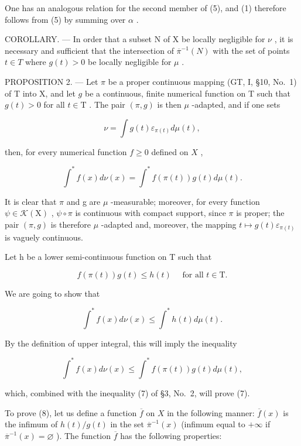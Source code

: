 One has an analogous relation for the second member of (5), and (1) therefore follows from (5) by summing over \(\alpha\) .

COROLLARY. --- In order that a subset N of X be locally negligible for \(\nu\) , it is necessary and sufficient that the intersection of \(\overline{\pi}^{-1}(N)\) with the set of points \(t \in T\) where \(g(t) > 0\) be locally negligible for \(\mu\) .

PROPOSITION 2. --- Let \(\pi\) be a proper continuous mapping (GT, I, §10, No.~1) of T into X, and let \(g\) be a continuous, finite numerical function on T such that \(g(t) > 0\) for all \(t \in \mathrm{T}\) . The pair \((\pi, g)\) is then \(\mu\) -adapted, and if one sets

\[
\nu = \int g (t) \varepsilon_ {\pi (t)} d \mu (t),
\]

then, for every numerical function \(f \geqslant 0\) defined on \(X\) ,

\[
\int^ {*} f (x) d \nu (x) = \int^ {*} f (\pi (t)) g (t) d \mu (t).\tag{7}
\]

It is clear that \(\pi\) and g are \(\mu\) -measurable; moreover, for every function \(\psi \in \mathcal{K}(\mathrm{X})\) , \(\psi \circ \pi\) is continuous with compact support, since \(\pi\) is proper; the pair \((\pi, g)\) is therefore \(\mu\) -adapted and, moreover, the mapping \(t \mapsto g(t) \varepsilon_{\pi(t)}\) is vaguely continuous.

Let h be a lower semi-continuous function on T such that

\[
f (\pi (t)) g (t) \leqslant h (t) \quad \text { for   all } t \in \mathrm{T}.
\]

We are going to show that

\[
\int^ {*} f (x) d \nu (x) \leqslant \int^ {*} h (t) d \mu (t).\tag{8}
\]

By the definition of upper integral, this will imply the inequality

\[
\int^ {*} f (x) d \nu (x) \leqslant \int^ {*} f (\pi (t)) g (t) d \mu (t),
\]

which, combined with the inequality (7) of §3, No.~2, will prove (7).

To prove (8), let us define a function \(\overline{f}\) on \(X\) in the following manner: \(\overline{f}(x)\) is the infimum of \(h(t) / g(t)\) in the set \(\overline{\pi}^{-1}(x)\) (infimum equal to \(+\infty\) if \(\overline{\pi}^{-1}(x) = \varnothing\) ). The function \(\overline{f}\) has the following properties:

